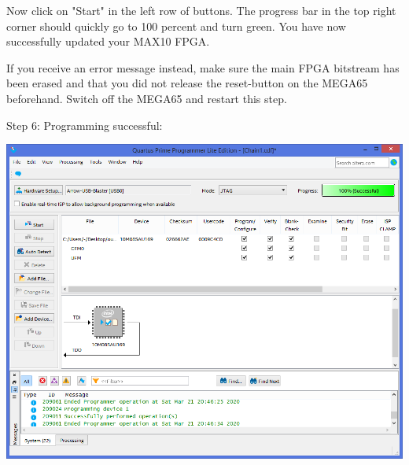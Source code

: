 Now click on "Start" in the left row of buttons. The progress bar in
the top right corner should quickly go to 100 percent and turn green.
You have now successfully updated your MAX10 FPGA.

If you receive an error message instead, make sure the main FPGA
bitstream has been erased and that you did not release the reset-button on
the MEGA65 beforehand. Switch off the MEGA65 and restart this step.

\begin{minipage}{\linewidth}
Step 6: Programming successful:
  \begin{center}
  \includegraphics[width=0.8\linewidth]{images/max10_06.png}
  \end{center}
\end{minipage}

